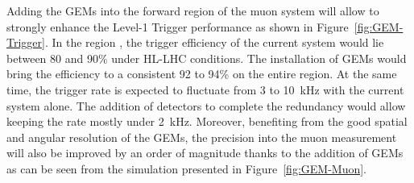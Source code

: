 	Adding the GEMs into the forward region of the muon system will allow to strongly enhance the Level-1 Trigger performance as shown in Figure~\ref{fig:GEM-Trigger}. In the region , the trigger efficiency of the current system would lie between 80 and 90\% under HL-LHC conditions. The installation of GEMs would bring the efficiency to a consistent 92 to 94\% on the entire region. At the same time, the trigger rate is expected to fluctuate from 3 to \SI{10}{kHz} with the current system alone. The addition of detectors to complete the redundancy would allow keeping the rate mostly under \SI{2}{kHz}. Moreover, benefiting from the good spatial and angular resolution of the GEMs, the precision into the muon measurement will also be improved by an order of magnitude thanks to the addition of GEMs as can be seen from the simulation presented in Figure~\ref{fig:GEM-Muon}.

